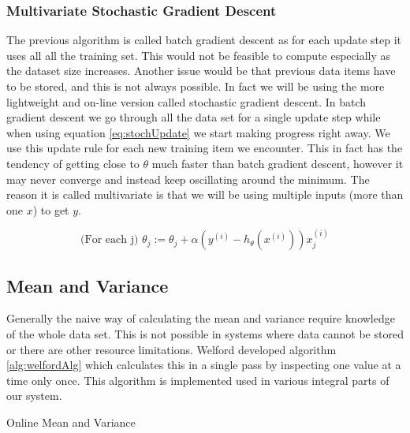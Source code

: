 \documentclass{mproj}
\begin{document}
\subsubsection{Multivariate Stochastic Gradient Descent}
The previous algorithm is called batch gradient descent as for each update step it uses all all the training set. This would not be feasible to compute especially as the dataset size increases. Another issue would be that previous data items have to be stored, and this is not always possible. In fact we will be using the more lightweight and on-line version called stochastic gradient descent. In batch gradient descent we go through all the data set for a single update step while when using equation \ref{eq:stochUpdate} we start making progress right away. We use this update rule for each new training item we encounter. This in fact has the tendency of getting close to $\theta$ much faster than batch gradient descent, however it may never converge and instead keep oscillating around the minimum. The reason it is called multivariate is that we will be using multiple inputs (more than one $x$) to get $y$.

\begin{equation}
\label{eq:stochUpdate}
\text{(For each j) }\theta_j := \theta_j + \alpha(y^{(i)}-h_\theta(x^{(i)}))x_j^{(i)}
\end{equation}

\subsection{Mean and Variance}
\label{sec:meanvariance}
Generally the naive way of calculating the mean and variance require knowledge of the whole data set. This is not possible in systems where data cannot be stored or there are other resource limitations. Welford \cite{meanvariance} developed algorithm \ref{alg:welfordAlg} which calculates this in a single pass by inspecting one value at a time only once. This algorithm is implemented used in various integral parts of our system.

\begin{algorithm}[H]
\caption{Online Mean and Variance \cite{meanvariance}}
\label{alg:welfordAlg}
\end{algorithm}
\end{document}
